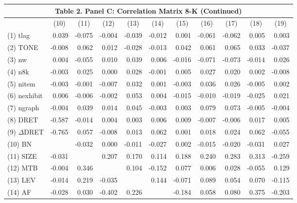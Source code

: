 \begin{table}[H]
  \begin{center}
  	\begin{tabular}{lrrrrrrrrrr}
  		\multicolumn{11}{c}{\textbf{Table 2. Panel C: Correlation Matrix 8-K (Continued) }} \\
  		\midrule
  		\midrule
  		& \multicolumn{1}{c}{(10)} & \multicolumn{1}{c}{(11)} & \multicolumn{1}{c}{(12)} & \multicolumn{1}{c}{(13)} & \multicolumn{1}{c}{(14)} & \multicolumn{1}{c}{(15)} & \multicolumn{1}{c}{(16)} & \multicolumn{1}{c}{(17)} & \multicolumn{1}{c}{(18)} & \multicolumn{1}{c}{(19)} \\
  		\midrule
  		(1) tlag & 0.039 & -0.075 & -0.004 & -0.039 & -0.012 & 0.001 & -0.061 & -0.062 & 0.005 & 0.003 \\
  		(2) TONE & -0.008 & 0.062 & 0.012 & -0.028 & -0.013 & 0.042 & 0.061 & 0.065 & 0.033 & -0.037 \\
  		(3) nw & 0.004 & -0.055 & 0.010 & 0.039 & 0.006 & -0.016 & -0.071 & -0.073 & -0.014 & 0.026 \\
  		(4) n8k & -0.003 & 0.025 & 0.000 & 0.028 & -0.001 & 0.005 & 0.027 & 0.020 & 0.002 & -0.008 \\
  		(5) nitem & -0.003 & -0.001 & -0.007 & 0.032 & 0.001 & -0.003 & 0.036 & 0.026 & -0.005 & 0.002 \\
  		(6) nexhibit & 0.006 & -0.006 & -0.002 & 0.053 & 0.004 & -0.015 & -0.010 & -0.019 & -0.025 & 0.021 \\
  		(7) ngraph & -0.004 & 0.039 & 0.014 & 0.045 & -0.003 & 0.003 & 0.079 & 0.073 & -0.005 & -0.004 \\
  		(8) DRET & -0.587 & -0.014 & 0.004 & 0.003 & 0.006 & 0.009 & -0.007 & -0.006 & 0.017 & 0.005 \\
  		(9) $\Delta$DRET & -0.765 & 0.057 & -0.008 & 0.013 & 0.062 & 0.001 & 0.018 & 0.024 & 0.062 & -0.055 \\
  		(10) BN & & -0.032 & 0.000 & -0.011 & -0.027 & 0.002 & -0.015 & -0.020 & -0.031 & 0.027 \\
  		(11) SIZE & -0.031 &  & 0.207 & 0.170 & 0.114 & 0.188 & 0.240 & 0.283 & 0.313 & -0.259 \\
  		(12) MTB & -0.004 & 0.346 &  & 0.104 & -0.152 & 0.077 & 0.006 & 0.028 & -0.055 & 0.129 \\
  		(13) LEV & -0.014 & 0.219 & -0.035 &  & 0.144 & -0.071 & 0.089 & 0.054 & 0.070 & -0.115 \\
  		(14) AF & -0.028 & 0.030 & -0.402 & 0.226 &  & -0.184 & 0.058 & 0.080 & 0.375 & -0.203 \\

\end{tabular}
\end{center}
\end{table}
